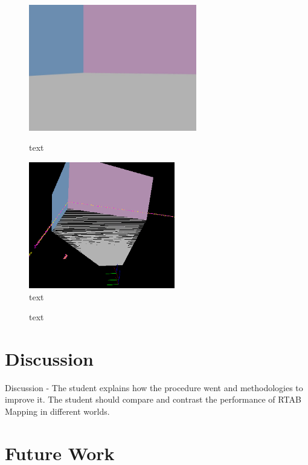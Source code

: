 \documentclass[a4paper]{article}
\begin{document}
\begin{figure}[h]
\centering
\begin{minipage}{0.45\textwidth}
\centering
\includegraphics[height=5.5cm]{slam_house_features_corner_3}
\caption{text}
\end{minipage}
\hspace{1cm}
\begin{minipage}{0.45\textwidth}
\centering
\includegraphics[height=5.5cm]{slam_house_constraints_3}
\caption{text}
\end{minipage}
\end{figure}

\begin{figure}
\centering
{}
\caption{text}
\end{figure}

\section{Discussion}
Discussion - The student explains how the procedure went and methodologies to improve it. The student should compare and contrast the performance of RTAB Mapping in different worlds.


\section{Future Work}




\end{document}
